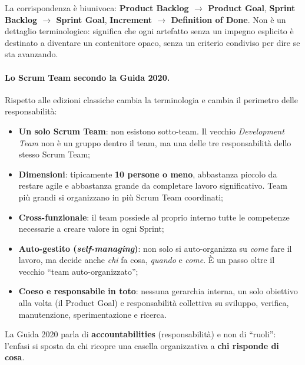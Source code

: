 \documentclass[12pt]{extarticle}
\begin{document}
\noindent La corrispondenza è biunivoca: \textbf{Product Backlog $\to$ Product Goal}, \textbf{Sprint Backlog $\to$ Sprint Goal}, \textbf{Increment $\to$ Definition of Done}. Non è un dettaglio terminologico: significa che ogni artefatto senza un impegno esplicito è destinato a diventare un contenitore opaco, senza un criterio condiviso per dire se sta avanzando.

\paragraph{Lo Scrum Team secondo la Guida 2020.}
Rispetto alle edizioni classiche cambia la terminologia e cambia il perimetro delle responsabilità:
\begin{itemize}
    \item \textbf{Un solo Scrum Team}: non esistono sotto-team. Il vecchio \textit{Development Team} non è un gruppo dentro il team, ma una delle tre responsabilità dello stesso Scrum Team;
    \item \textbf{Dimensioni}: tipicamente \textbf{10 persone o meno}, abbastanza piccolo da restare agile e abbastanza grande da completare lavoro significativo. Team più grandi si organizzano in più Scrum Team coordinati;
    \item \textbf{Cross-funzionale}: il team possiede al proprio interno tutte le competenze necessarie a creare valore in ogni Sprint;
    \item \textbf{Auto-gestito (\textit{self-managing})}: non solo si auto-organizza su \textit{come} fare il lavoro, ma decide anche \textit{chi} fa cosa, \textit{quando} e \textit{come}. È un passo oltre il vecchio ``team auto-organizzato'';
    \item \textbf{Coeso e responsabile in toto}: nessuna gerarchia interna, un solo obiettivo alla volta (il Product Goal) e responsabilità collettiva su sviluppo, verifica, manutenzione, sperimentazione e ricerca.
\end{itemize}

\noindent La Guida 2020 parla di \textbf{accountabilities} (responsabilità) e non di ``ruoli'': l'enfasi si sposta da chi ricopre una casella organizzativa a \textbf{chi risponde di cosa}.
\end{document}
